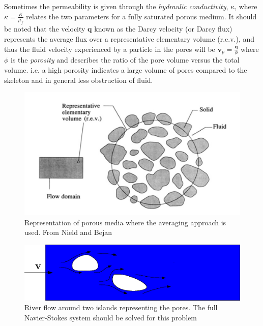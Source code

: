 Sometimes the permeability is given through the \textit{hydraulic conductivity}, $\kappa$, where $\kappa = \frac{K}{\mu_f}$ relates the two parameters for a fully saturated porous medium. It should be noted that the velocity $\mathbf{q}$ known as the Darcy velocity (or Darcy flux) represents the average flux over a representative elementary volume (r.e.v.), and thus the fluid velocity experienced by a particle in the pores will be $\mathbf{v}_p = \frac{\mathbf{q}}{\phi}$ where $\phi$ is the \textit{porosity} and describes the ratio of the pore volume versus the total volume. i.e. a high porosity indicates a large volume of pores compared to the skeleton and in general less obstruction of fluid.
\begin{center}
\begin{figure}[!ht]
\includegraphics[scale=0.3]{figures/Porous_REV}
\caption{Representation of porous media where the averaging approach is used. From Nield and Bejan}
\end{figure}
\end{center}
\begin{center}
\begin{figure}[!ht]
\includegraphics[width=0.9\linewidth]{figures/Porous_Islands}
\caption{River flow around two islands representing the pores. The full Navier-Stokes system should be solved for this problem}
\end{figure}
\end{center}
